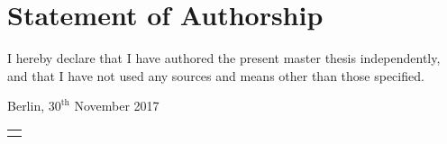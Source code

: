 \chapter*{Statement of Authorship}




I hereby declare that I have authored the present master thesis independently, and that I have not used any sources and means other than those specified.



\vspace{2\baselineskip}

\noindent Berlin, $30^{\mathrm{th}}$ November 2017 
%
\vspace{0.1cm}
\\
\hspace*{\fill}\begin{tabular}{@{}l@{}}\hline
	\makebox[5cm]{\dcauthorsurname\ \dcauthorname}
\end{tabular}
